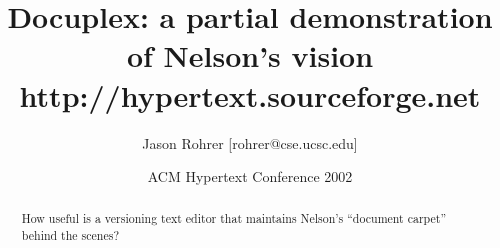 \documentclass[12pt]{article}
\begin{document}
\newcommand{\http}{{\sc http}}
\newcommand{\url}{{\sc url}}


\newcommand{\insertfigure}[4] {
	\begin{figure}[tb]
		\begin{center}
			\fbox{
				\begin{minipage}{#1}
					\texttt{[image: \#2]}
				
					\caption{#3}
				
					\label{#4}
				\end{minipage}
			} 
		\end{center}
	\end{figure}
}

\newlength{\oldUnitLength}

\newcommand{\insertpicture}[5] {
	\begin{figure}[tb]
		\begin{center}
			\fbox{
				\begin{minipage}{#1}
                    \begin{pspicture*}(0,0)(\textwidth, #2\textwidth)
                    \psset{xunit=\textwidth}
                    \psset{yunit=\textwidth}
                    \psset{runit=\textwidth}                 
                        #5
                    \end{pspicture*}
					\caption{#3}
				
					\label{#4}
				\end{minipage}
			} 
		\end{center}
	\end{figure}
}






\author{Jason Rohrer [rohrer@cse.ucsc.edu]}
\date{ACM Hypertext Conference 2002}
\title{Docuplex:  a partial demonstration of Nelson's vision\\ http://hypertext.sourceforge.net}


\maketitle


\begin{abstract}
How useful is a versioning text editor that maintains Nelson's ``document carpet'' behind the scenes? 
\end{abstract}
\end{document}
